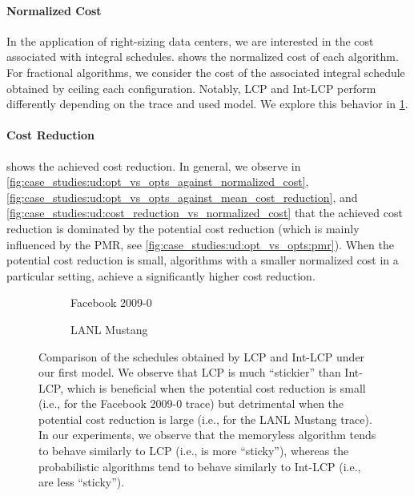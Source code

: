 \paragraph{Normalized Cost} In the application of right-sizing data centers, we are interested in the cost associated with integral schedules.  shows the normalized cost of each algorithm. For fractional algorithms, we consider the cost of the associated integral schedule obtained by ceiling each configuration. Notably, LCP and Int-LCP perform differently depending on the trace and used model. We explore this behavior in \cref{fig:case_studies:ud:lcp_vs_int_lcp}.

\paragraph{Cost Reduction}  shows the achieved cost reduction. In general, we observe in \cref{fig:case_studies:ud:opt_vs_opts_against_normalized_cost}, \cref{fig:case_studies:ud:opt_vs_opts_against_mean_cost_reduction}, and \cref{fig:case_studies:ud:cost_reduction_vs_normalized_cost} that the achieved cost reduction is dominated by the potential cost reduction (which is mainly influenced by the PMR, see \cref{fig:case_studies:ud:opt_vs_opts:pmr}). When the potential cost reduction is small, algorithms with a smaller normalized cost in a particular setting, achieve a significantly higher cost reduction.

\begin{figure}
    \begin{subfigure}[b]{.5175\linewidth}
    \resizebox{\textwidth}{!}{}
    \caption{Facebook 2009-0}
    \end{subfigure}
    \begin{subfigure}[b]{.4825\linewidth}
    \resizebox{\textwidth}{!}{}
    \caption{LANL Mustang}
    \end{subfigure}
    \caption{Comparison of the schedules obtained by LCP and Int-LCP under our first model. We observe that LCP is much ``stickier'' than Int-LCP, which is beneficial when the potential cost reduction is small (i.e., for the Facebook 2009-0 trace) but detrimental when the potential cost reduction is large (i.e., for the LANL Mustang trace). In our experiments, we observe that the memoryless algorithm tends to behave similarly to LCP (i.e., is more ``sticky''), whereas the probabilistic algorithms tend to behave similarly to Int-LCP (i.e., are less ``sticky'').}\label{fig:case_studies:ud:lcp_vs_int_lcp}
\end{figure}

